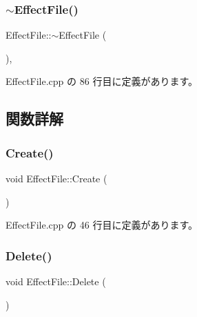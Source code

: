 \mbox{\label{class_effect_file_ad91db4821340cdcfd855d168a7e3fbf8}} 
\subsubsection{\texorpdfstring{$\sim$\+Effect\+File()}{~EffectFile()}}
{\footnotesize\ttfamily Effect\+File\+::$\sim$\+Effect\+File (\begin{DoxyParamCaption}{ }\end{DoxyParamCaption})\hspace{0.3cm}{\ttfamily [private]}, {\ttfamily [virtual]}}



 Effect\+File.\+cpp の 86 行目に定義があります。



\subsection{関数詳解}
\mbox{\label{class_effect_file_a637faf44d3465e7fe8a665d339680ba8}} 
\subsubsection{\texorpdfstring{Create()}{Create()}}
{\footnotesize\ttfamily void Effect\+File\+::\+Create (\begin{DoxyParamCaption}{ }\end{DoxyParamCaption})\hspace{0.3cm}{\ttfamily [static]}}



 Effect\+File.\+cpp の 46 行目に定義があります。

\mbox{\label{class_effect_file_a0d9799f2ea38fa594b59e43183d70ce0}} 
\subsubsection{\texorpdfstring{Delete()}{Delete()}}
{\footnotesize\ttfamily void Effect\+File\+::\+Delete (\begin{DoxyParamCaption}{ }\end{DoxyParamCaption})\hspace{0.3cm}{\ttfamily [static]}}



